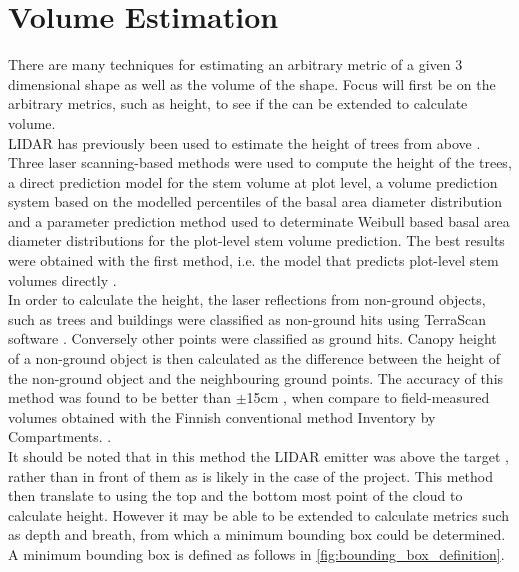 \section{Volume Estimation}
\label{design:volume estimation}
There are many techniques for estimating an arbitrary metric of a given 3 dimensional shape as well as the volume of the shape.
Focus will first be on the arbitrary metrics, such as height, to see if the can be extended to calculate volume.\\

LIDAR has previously been used to estimate the height of trees from above \cite{Maltamo2006}. Three laser scanning-based methods were used to compute the height of the trees, a direct prediction model for the stem volume at plot level, a volume prediction system based on the modelled percentiles of the basal area diameter distribution and a parameter prediction method used to determinate Weibull based basal area diameter distributions \cite{Frechet1927} for the plot-level stem volume prediction. The best results were obtained with the first method, i.e. the model that predicts plot-level stem volumes directly \cite{Maltamo2006}.\\

In order to calculate the height, the laser reflections from non-ground objects, such as trees and buildings were classified as non-ground hits using TerraScan software \cite{Solid2013}. Conversely other points were classified as ground hits.
Canopy height of a non-ground object is then calculated as the difference between the height of the non-ground object and the neighbouring ground points. 
The accuracy of this method was found to be better than $\pm$15cm \cite{Maltamo2006}, when compare to field-measured volumes obtained with the Finnish conventional method Inventory by Compartments. \cite{Koivuniemi2006}.\\

It should be noted that in this method the LIDAR emitter was above the target \cite{Maltamo2006}, rather than in front of them as is likely in the case of the project. This method then translate to using the top and the bottom most point of the cloud to calculate height. However it may be able to be extended to calculate metrics such as depth and breath, from which a minimum bounding box could be determined.\\

A minimum bounding box is defined as follows in \ref{fig:bounding_box_definition}.\\


